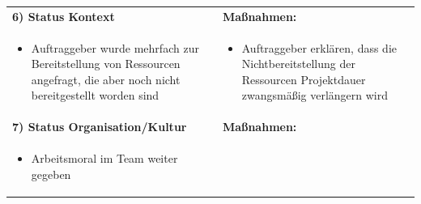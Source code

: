 \begin{center}
\begin{scriptsize}
\begin{tabularx}{\textwidth}{|p{8cm}|X|}
    \hline
    \textbf{6) Status Kontext} & \textbf{Maßnahmen:}\\
    \begin{minipage}{.555\textwidth} 
    \begin{flushleft}
        \begin{itemize} \vspace{0cm}  
            \item Auftraggeber wurde mehrfach zur Bereitstellung von Ressourcen angefragt, die aber noch nicht bereitgestellt worden sind
            \vspace{0.2cm}
    \end{itemize}
    \end{flushleft}
    \end{minipage} &
    \begin{minipage}{.4\textwidth} 
    \begin{flushleft}
        \begin{itemize} %
         \item Auftraggeber erklären, dass die Nichtbereitstellung der Ressourcen Projektdauer zwangsmäßig verlängern wird
          \vspace{0.2cm}
    \end{itemize}
    \end{flushleft}
    \end{minipage} \\
    \hline
    \textbf{7) Status Organisation/Kultur} & \textbf{Maßnahmen:}\\
    \begin{minipage}{.56\textwidth} 
    \begin{flushleft}
        \begin{itemize} %
         \item Arbeitsmoral im Team weiter gegeben

\end{itemize}
\end{flushleft}
\end{minipage}
\end{tabularx}
\end{scriptsize}
\end{center}
